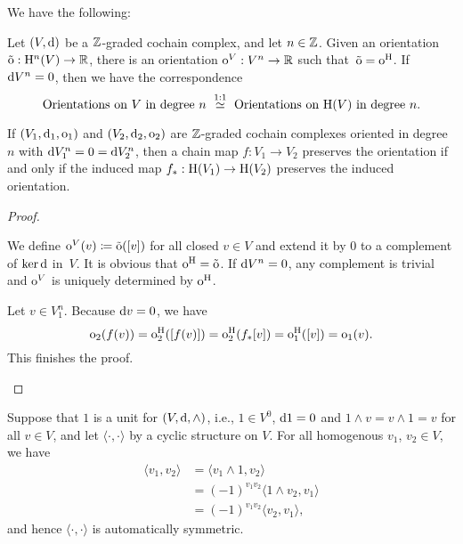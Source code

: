 \documentclass[\MainFolder/Text.tex]{subfiles}
\begin{document}
\begin{Proposition}\label{Prop:OrOnHomG}
We have the following:
\begin{ClaimList}
\item Let $(V,\mathrm{d})$ be a $\mathbb{Z}$-graded cochain complex, and let $n\in \mathbb{Z}$. Given an orientation $\tilde{\mathrm{o}}: \mathrm{H}^n(V) \rightarrow \mathbb{R}$, there is an orientation $\mathrm{o}^V: V^n \rightarrow \mathbb{R}$ such that~$\tilde{\mathrm{o}} = \mathrm{o}^{\mathrm{H}}$. If $\mathrm{d} V^n = 0$, then we have the correspondence
\[\text{Orientations on }V\text{ in degree }n\ \overset{1:1}{\simeq}\ \text{Orientations on }\H(V)\text{ in degree }n. \]  
\item If $(V_1,\mathrm{d}_1,\mathrm{o}_1)$ and $(V_2,\mathrm{d}_2,\mathrm{o}_2)$ are $\mathbb{Z}$-graded cochain complexes oriented in degree $n$ with $\mathrm{d} V_1^n = 0 = \mathrm{d} V_2^n$, then a chain map $f: V_1 \rightarrow V_2$ preserves the orientation if and only if the induced map $f_*: \mathrm{H}(V_1) \rightarrow \mathrm{H}(V_2)$ preserves the induced orientation.
\end{ClaimList}
\end{Proposition}
\begin{proof}
\begin{ProofList}
\item We define $\mathrm{o}^V(v) \coloneqq \tilde{\mathrm{o}}([v])$ for all closed $v\in V$ and extend it by $0$ to a complement of $\operatorname{ker} \mathrm{d}$ in~$V$. It is obvious that $\mathrm{o}^{\mathrm{H}} = \tilde{\mathrm{o}}$. If $\mathrm{d} V^n = 0$, any complement is trivial and $\mathrm{o}^V$ is uniquely determined by $\mathrm{o}^{\mathrm{H}}$.

\item Let $v\in V_1^n$. Because $\mathrm{d} v = 0$, we have
\[ \mathrm{o}_2(f(v)) = \mathrm{o}^{\mathrm{H}}_2([f(v)]) = \mathrm{o}^{\mathrm{H}}_2(f_*[v]) = \mathrm{o}^{\mathrm{H}}_1([v]) = \mathrm{o}_1(v). \]
This finishes the proof.\qedhere
\end{ProofList}
\end{proof}

Suppose that $1$ is a unit for $(V,\mathrm{d},\wedge)$, i.e., $1\in V^0$, $\mathrm{d} 1 = 0$ and $1\wedge v = v \wedge 1 = v$ for all $v\in V$, and let $\langle \cdot,\cdot\rangle$ by a cyclic structure on $V$. For all homogenous $v_1$, $v_2\in V$, we have 
\begin{align*}
\langle v_1, v_2 \rangle &= \langle v_1\wedge 1,v_2\rangle \\
& = (-1)^{v_1 v_2}\langle 1\wedge v_2, v_1 \rangle \\
& = (-1)^{v_1 v_2}\langle v_2, v_1 \rangle,  
\end{align*}
and hence $\langle \cdot,\cdot\rangle$ is automatically symmetric.
\end{document}

